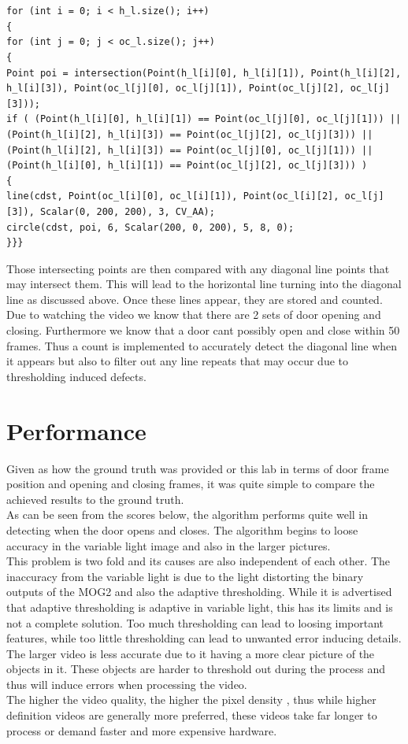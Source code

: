 \documentclass{article}
\begin{document}
\begin{lstlisting}


for (int i = 0; i < h_l.size(); i++)
{
for (int j = 0; j < oc_l.size(); j++)
{
Point poi = intersection(Point(h_l[i][0], h_l[i][1]), Point(h_l[i][2], h_l[i][3]), Point(oc_l[j][0], oc_l[j][1]), Point(oc_l[j][2], oc_l[j][3]));
if ( (Point(h_l[i][0], h_l[i][1]) == Point(oc_l[j][0], oc_l[j][1])) || (Point(h_l[i][2], h_l[i][3]) == Point(oc_l[j][2], oc_l[j][3])) || (Point(h_l[i][2], h_l[i][3]) == Point(oc_l[j][0], oc_l[j][1])) || (Point(h_l[i][0], h_l[i][1]) == Point(oc_l[j][2], oc_l[j][3])) )
{
line(cdst, Point(oc_l[i][0], oc_l[i][1]), Point(oc_l[i][2], oc_l[j][3]), Scalar(0, 200, 200), 3, CV_AA);
circle(cdst, poi, 6, Scalar(200, 0, 200), 5, 8, 0);
}}}

\end{lstlisting}
Those intersecting points are then compared with any diagonal line points that may intersect them. This will lead to the horizontal line turning into the diagonal line as discussed above. Once these lines appear, they are stored and counted. Due to watching the video we know that there are 2 sets of door opening and closing. Furthermore we know that a door cant possibly open and close within 50 frames. Thus a count is implemented to accurately detect the diagonal line when it appears but also to filter out any line repeats that may occur due to thresholding induced defects.




\section{Performance}\label{sec:intro}
Given as how the ground truth was provided or this lab in terms of door frame position and opening and closing frames, it was quite simple to compare the achieved results to the ground truth. \\

As can be seen from the scores below, the algorithm performs quite well in detecting when the door opens and closes. The algorithm begins to loose accuracy in the variable light image and also in the larger pictures.\\
This problem is two fold and its causes are also independent of each other. The inaccuracy from the variable light is due to the light distorting the binary outputs of the MOG2 and also the adaptive thresholding. While it is advertised that adaptive thresholding is adaptive in variable light, this has its limits and is not a complete solution. Too much thresholding can lead to loosing important features, while too little thresholding can lead to unwanted error inducing details.\\
The larger video is less accurate due to it having a more clear picture of the objects in it. These objects are harder to threshold out during the process and thus will induce errors when processing the video.\\
The higher the video quality, the higher the pixel density , thus while higher definition videos are generally more preferred, these videos take far longer to process or demand faster and more expensive hardware.\\
\end{document}
